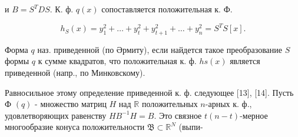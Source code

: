 \documentclass[10pt]{article}
\begin{document}
и $B=S^{T} D S$. К. ф. $q(x)$ сопоставляется положительная к. Ф.



\[

h_{S}(x)=y_{1}^{2}+\ldots+y_{t}^{2}+y_{t+1}^{2}+\ldots+y_{n}^{2}=S^{T} S[x] .

\]



Форма $q$ наз. приведенной (по Әрмиту), если найдется такое преобразование $S$ формы $q$ к сумме квадратов, что положительная к. ф. $h s(x)$ является приведенной (напр., по Минковскому).



Равносильное этому определение приведенной к. ф. следующее [13], [14]. Пусть Ф $(q)$ - множество матриц $H$ над $\mathbb{R}$ положительных $n$-арных к. ф., удовлетворяющих равенству $H B^{-1} H=B$. Это связное $t(n-t)$-мерное многообразие конуса положительности $\mathfrak{B} \subset \mathbb{R}^{N}$ (выпи-
\end{document}
